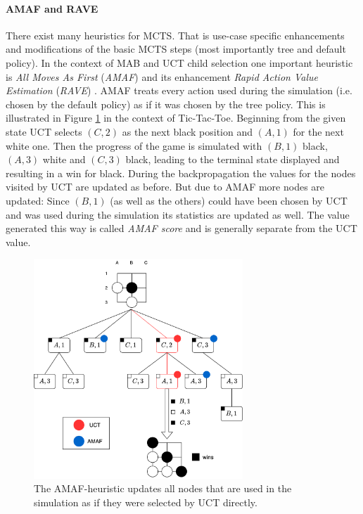 \paragraph{AMAF and RAVE} There exist many heuristics for MCTS. That is use-case specific enhancements and modifications of the basic MCTS steps (most importantly tree and default policy). In the context of MAB and UCT child selection one important heuristic is \textit{All Moves As First} (\textit{AMAF}) \cite{gelly2007combining} and its enhancement \textit{Rapid Action Value Estimation} (\textit{RAVE}) \cite{gelly2011monte}. AMAF treats every action used during the simulation (i.e. chosen by the default policy) as if it was chosen by the tree policy. This is illustrated in Figure \ref{fig:amaf} in the context of Tic-Tac-Toe. Beginning from the given state UCT selects $(C,2)$ as the next black position and $(A,1)$ for the next white one. Then the progress of the game is simulated with $(B,1)$ black, $(A,3)$ white and $(C,3)$ black, leading to the terminal state displayed and resulting in a win for black. During the backpropagation the values for the nodes visited by UCT are updated as before. But due to AMAF more nodes are updated: Since $(B,1)$ (as well as the others) could have been chosen by UCT and was used during the simulation its statistics are updated as well. The value generated this way is called \textit{AMAF score} and is generally separate from the UCT value.
\begin{figure}
    \centering
    \includegraphics[width=0.7\textwidth]{img/amaf.png}
    \caption{The AMAF-heuristic updates all nodes that are used in the simulation as if they were selected by UCT directly.}
    \label{fig:amaf}
\end{figure}
